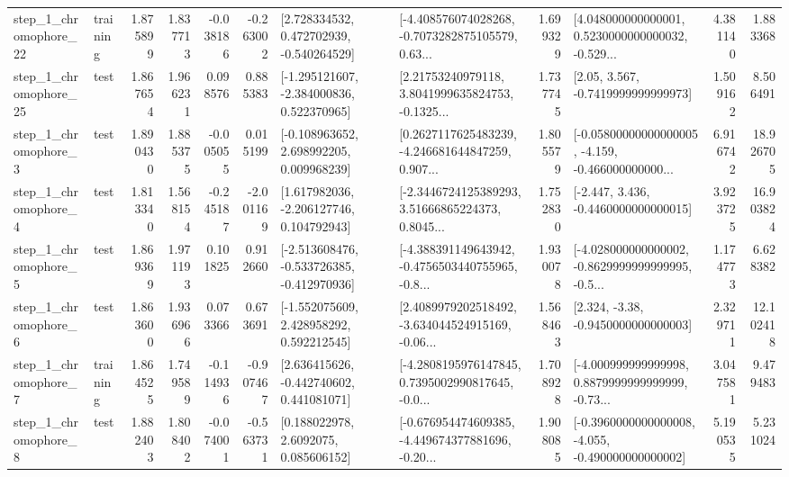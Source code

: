 \begin{tabular}{llrrrrllrlrr}
    step\_1\_chromophore\_22 &  training &      1.875899 &    1.837713 &     -0.038186 & -0.263002 &    [2.728334532, 0.472702939, -0.540264529] &  [-4.408576074028268, -0.7073282875105579, 0.63... &       1.699329 &  [4.048000000000001, 0.5230000000000032, -0.529... &            4.381140 &          1.883368 \\
    step\_1\_chromophore\_25 &      test &      1.867654 &    1.966231 &      0.098576 &  0.885383 &   [-1.295121607, -2.384000836, 0.522370965] &  [2.21753240979118, 3.8041999635824753, -0.1325... &       1.737745 &                 [2.05, 3.567, -0.7419999999999973] &            1.509162 &          8.506491 \\
     step\_1\_chromophore\_3 &      test &      1.890430 &    1.885375 &     -0.005055 &  0.015199 &    [-0.108963652, 2.698992205, 0.009968239] &  [0.2627117625483239, -4.246681644847259, 0.907... &       1.805579 &  [-0.05800000000000005, -4.159, -0.466000000000... &            6.916742 &         18.926705 \\
     step\_1\_chromophore\_4 &      test &      1.813340 &    1.568154 &     -0.245187 & -2.001169 &    [1.617982036, -2.206127746, 0.104792943] &  [-2.3446724125389293, 3.51666865224373, 0.8045... &       1.752830 &               [-2.447, 3.436, -0.4460000000000015] &            3.923725 &         16.903824 \\
     step\_1\_chromophore\_5 &      test &      1.869369 &    1.971193 &      0.101825 &  0.912660 &  [-2.513608476, -0.533726385, -0.412970936] &  [-4.388391149643942, -0.4756503440755965, -0.8... &       1.930078 &  [-4.028000000000002, -0.8629999999999995, -0.5... &            1.174773 &          6.628382 \\
     step\_1\_chromophore\_6 &      test &      1.863600 &    1.936966 &      0.073366 &  0.673691 &    [-1.552075609, 2.428958292, 0.592212545] &  [2.4089979202518492, -3.634044524915169, -0.06... &       1.568463 &                [2.324, -3.38, -0.9450000000000003] &            2.329711 &         12.102418 \\
     step\_1\_chromophore\_7 &  training &      1.864525 &    1.749589 &     -0.114936 & -0.907467 &    [2.636415626, -0.442740602, 0.441081071] &  [-4.2808195976147845, 0.7395002990817645, -0.0... &       1.708928 &  [-4.000999999999998, 0.8879999999999999, -0.73... &            3.047581 &          9.479483 \\
     step\_1\_chromophore\_8 &      test &      1.882403 &    1.808402 &     -0.074001 & -0.563731 &       [0.188022978, 2.6092075, 0.085606152] &  [-0.676954474609385, -4.449674377881696, -0.20... &       1.908085 &  [-0.3960000000000008, -4.055, -0.490000000000002] &            5.190535 &          5.231024 \\

\end{tabular}
